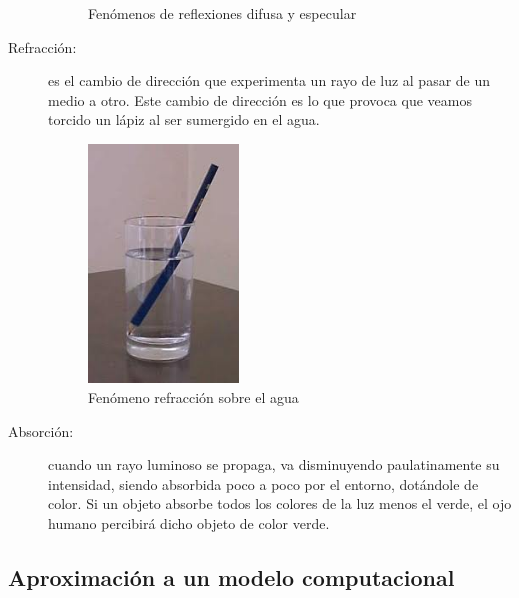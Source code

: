 \begin{description}
\begin{figure}[h]
	\centering
	\caption{Fenómenos de reflexiones difusa y especular}
\end{figure}
\item [Refracción:] es el cambio de dirección que experimenta un rayo de luz al pasar de un medio a otro. Este cambio de dirección es lo que provoca que veamos torcido un lápiz al ser sumergido en el agua.
\begin{figure}[h]
	\centering
	          \includegraphics[width=4cm]{img/refraction.jpg}
	\caption{Fenómeno refracción sobre el agua}
\end{figure}
\item [Absorción:] cuando un rayo luminoso se propaga, va disminuyendo paulatinamente su intensidad, siendo absorbida poco a poco por el entorno, dotándole de color.  Si un objeto absorbe todos los colores de la luz menos el verde, el ojo humano percibirá dicho objeto de color verde.
\end{description}


\subsection{Aproximación a un modelo computacional}


